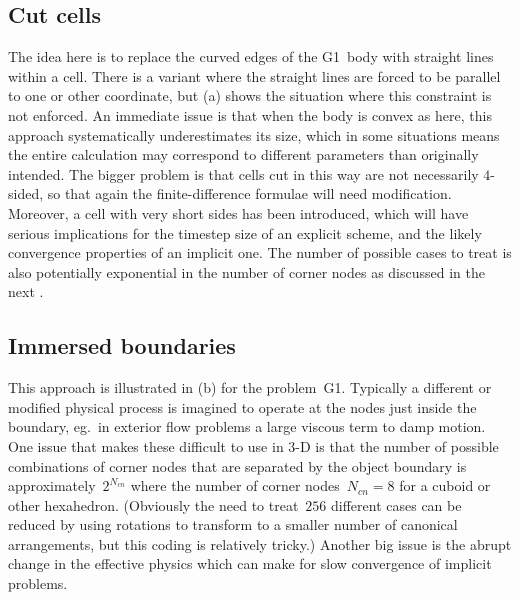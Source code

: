 \subsection{Cut cells}\label{sec:cutcells}
The idea here is to replace the curved edges of the G1~body with straight lines within
a cell. There is a variant where the straight lines are forced to be parallel to one
or other coordinate, but (a) shows the situation where this constraint is
not enforced. An immediate issue is that when the body is convex as here, this approach
systematically underestimates its size, which in some situations means the entire
calculation may correspond to different parameters than originally intended.
The bigger problem is that cells cut in this way are not necessarily $4$-sided,
so that again the finite-difference formulae will need modification. Moreover, a 
cell with very short sides has been introduced, which will have serious
implications for the timestep size of an explicit scheme, and the likely
convergence properties of an implicit one. The number of possible cases to treat
is also potentially exponential in the number of corner nodes as discussed in
the next .


\subsection{Immersed boundaries}\label{sec:immersed}
This approach is illustrated in (b) for the problem~G1.
Typically a different or modified physical
process is imagined to operate at the nodes just inside the boundary, eg.\ 
in exterior flow problems a large viscous term to damp motion.
One issue that makes these difficult to use in 3-D is that the number
of possible combinations of corner nodes that are separated by the
object boundary is approximately~$2^{N_{cn}}$ where the number of corner
nodes~$N_{cn}=8$ for a cuboid
or other hexahedron. (Obviously the need to treat~$256$ different cases can be reduced
by using rotations to transform to a smaller number of canonical arrangements,
but this coding is relatively tricky.)
Another big issue is the abrupt change in the effective physics which
can make for slow convergence of implicit problems.

